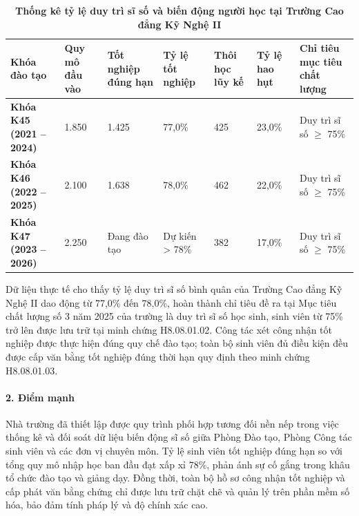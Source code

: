 \begin{table}[htbp]
\centering
\small
\setlength{\tabcolsep}{3.5pt}
\caption{\textbf{Thống kê tỷ lệ duy trì sĩ số và biến động người học tại Trường Cao đẳng Kỹ Nghệ II}}
\vspace{0.2cm}
\begin{tabularx}{\textwidth}{L{2.8cm} C{1.5cm} C{1.6cm} C{1.5cm} C{1.5cm} C{1.5cm} X}
\toprule
\textbf{Khóa đào tạo} & \textbf{Quy mô đầu vào} & \textbf{Tốt nghiệp đúng hạn} & \textbf{Tỷ lệ tốt nghiệp} & \textbf{Thôi học lũy kế} & \textbf{Tỷ lệ hao hụt} & \textbf{Chỉ tiêu mục tiêu chất lượng} \\
\midrule
\textbf{Khóa K45 (2021 -- 2024)} & 1.850 & 1.425 & 77,0\% & 425 & 23,0\% & Duy trì sĩ số $\ge$ 75\% \\
\addlinespace
\textbf{Khóa K46 (2022 -- 2025)} & 2.100 & 1.638 & 78,0\% & 462 & 22,0\% & Duy trì sĩ số $\ge$ 75\% \\
\addlinespace
\textbf{Khóa K47 (2023 -- 2026)} & 2.250 & Đang đào tạo & Dự kiến > 78\% & 382 & 17,0\% & Duy trì sĩ số $\ge$ 75\% \\
\bottomrule
\end{tabularx}
\end{table}

Dữ liệu thực tế cho thấy tỷ lệ duy trì sĩ số bình quân của Trường Cao đẳng Kỹ Nghệ II dao động từ 77,0\% đến 78,0\%, hoàn thành chỉ tiêu đề ra tại Mục tiêu chất lượng số 3 năm 2025 của trường là duy trì sĩ số học sinh, sinh viên từ 75\% trở lên được lưu trữ tại minh chứng H8.08.01.02. Công tác xét công nhận tốt nghiệp được thực hiện đúng quy chế đào tạo; toàn bộ sinh viên đủ điều kiện đều được cấp văn bằng tốt nghiệp đúng thời hạn quy định theo minh chứng H8.08.01.03.

\paragraph{2. Điểm mạnh}
Nhà trường đã thiết lập được quy trình phối hợp tương đối nền nếp trong việc thống kê và đối soát dữ liệu biến động sĩ số giữa Phòng Đào tạo, Phòng Công tác sinh viên và các đơn vị chuyên môn. Tỷ lệ sinh viên tốt nghiệp đúng hạn so với tổng quy mô nhập học ban đầu đạt xấp xỉ 78\%, phản ánh sự cố gắng trong khâu tổ chức đào tạo và giảng dạy. Đồng thời, toàn bộ hồ sơ công nhận tốt nghiệp và cấp phát văn bằng chứng chỉ được lưu trữ chặt chẽ và quản lý trên phần mềm số hóa, bảo đảm tính pháp lý và độ chính xác cao.

